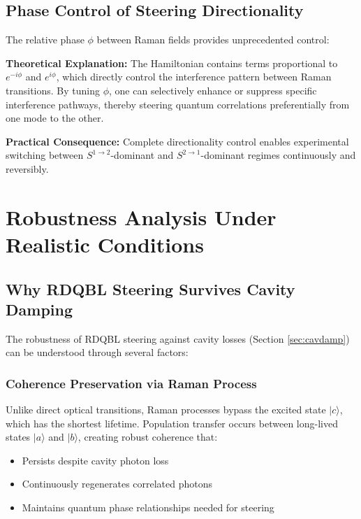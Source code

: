 \subsection{Phase Control of Steering Directionality}

The relative phase $\phi$ between Raman fields provides unprecedented control:

\textbf{Theoretical Explanation:}
The Hamiltonian contains terms proportional to $e^{-i\phi}$ and $e^{i\phi}$, which directly control the interference pattern between Raman transitions. By tuning $\phi$, one can selectively enhance or suppress specific interference pathways, thereby steering quantum correlations preferentially from one mode to the other.

\textbf{Practical Consequence:}
Complete directionality control enables experimental switching between $S^{1 \to 2}$-dominant and $S^{2 \to 1}$-dominant regimes continuously and reversibly.

\section{Robustness Analysis Under Realistic Conditions}

\subsection{Why RDQBL Steering Survives Cavity Damping}

The robustness of RDQBL steering against cavity losses (Section \ref{sec:cavdamp}) can be understood through several factors:

\subsubsection{Coherence Preservation via Raman Process}

Unlike direct optical transitions, Raman processes bypass the excited state $|c\rangle$, which has the shortest lifetime. Population transfer occurs between long-lived states $|a\rangle$ and $|b\rangle$, creating robust coherence that:
\begin{itemize}
	\item Persists despite cavity photon loss
	\item Continuously regenerates correlated photons
	\item Maintains quantum phase relationships needed for steering
\end{itemize}

